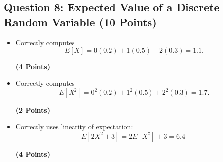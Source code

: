 \documentclass[11pt, letterpaper]{article}
\newcommand{\question}[2]{
    \subsection*{Question #1: #2}
}
\newcommand{\points}[1]{
    \textbf{(#1 Points)}
}
\begin{document}
\question{8}{Expected Value of a Discrete Random Variable \points{10}}

\begin{itemize}
    \item Correctly computes
    \[
    E[X]=0(0.2)+1(0.5)+2(0.3)=1.1.
    \]
    \points{4}

    \item Correctly computes
    \[
    E[X^2]=0^2(0.2)+1^2(0.5)+2^2(0.3)=1.7.
    \]
    \points{2}

    \item Correctly uses linearity of expectation:
    \[
    E[2X^2+3]=2E[X^2]+3=6.4.
    \]
    \points{4}
\end{itemize}
\end{document}
